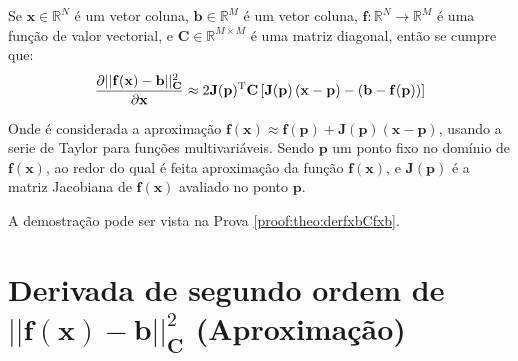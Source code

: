 \begin{theorem}\label{theo:derfxbCfxb}
Se 
$\mathbf{x}\in \mathbb{R}^N$ é um vetor coluna, 
$\mathbf{b}\in \mathbb{R}^M$ é um vetor coluna,  
$\mathbf{f}: \mathbb{R}^{N}\rightarrow \mathbb{R}^{M}$ é uma função de valor vectorial, e
$\mathbf{C} \in \mathbb{R}^{M\times M}$ é uma matriz diagonal, 
então se cumpre que:
\begin{equation}
\frac{\partial ||\mathbf{f}(\mathbf{x})-\mathbf{b}||_{\mathbf{C}}^2}{\partial \mathbf{x}} \approx
2 \mathbf{J}(\mathbf{p})^{\mathrm{T}}\mathbf{C}\left[\mathbf{J}(\mathbf{p})\left(\mathbf{x} - \mathbf{p}\right)-\left(\mathbf{b}-\mathbf{f}(\mathbf{p})\right)\right]
\end{equation}

Onde é considerada a aproximação
$\mathbf{f}(\mathbf{x})\approx \mathbf{f}(\mathbf{p})+\mathbf{J}(\mathbf{p})\left(\mathbf{x}-\mathbf{p}\right)$,
usando a serie de Taylor para funções multivariáveis. Sendo $\mathbf{p}$ um ponto fixo no domínio de $\mathbf{f}(\mathbf{x})$,  ao redor do qual é feita  aproximação
da função $\mathbf{f}(\mathbf{x})$,
e $\mathbf{J}(\mathbf{p})$ é a matriz Jacobiana de $\mathbf{f}(\mathbf{x})$ avaliado no ponto $\mathbf{p}$.

A demostração pode ser vista na Prova \ref{proof:theo:derfxbCfxb}.
\end{theorem}

\section{Derivada de segundo ordem de $||\mathbf{f}(\mathbf{x})-\mathbf{b}||_{\mathbf{C}}^2$  
(Aproximação)
}

